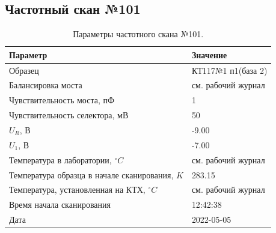 \subsection{Частотный скан №101}
\begin{table}[!ht]
    \centering
    \caption{Параметры частотного скана №101.}
    \begin{tabular}{|l|l|}
        \hline
        Параметр                                       & Значение                  \\ \hline
        Образец                                        & КТ117№1 п1(база 2)        \\ \hline
        Балансировка моста                             & см. рабочий журнал        \\ \hline
        Чувствительность моста, пФ                     & 1                         \\ \hline
        Чувствительность селектора, мВ                 & 50                        \\ \hline
        $U_R$, В                                       & -9.00                     \\ \hline
        $U_1$, В                                       & -7.00                     \\ \hline
        Температура в лаборатории, $^\circ C$          & см. рабочий журнал        \\ \hline
        Температура образца в начале сканирования, $K$ & 283.15                    \\ \hline
        Температура, установленная на КТХ, $^\circ C$  & см. рабочий журнал        \\ \hline
        Время начала сканирования                      & 12:42:38                  \\ \hline
        Дата                                           & 2022-05-05                \\ \hline
    \end{tabular}
    \label{table:frequency_scan_101}
\end{table}

